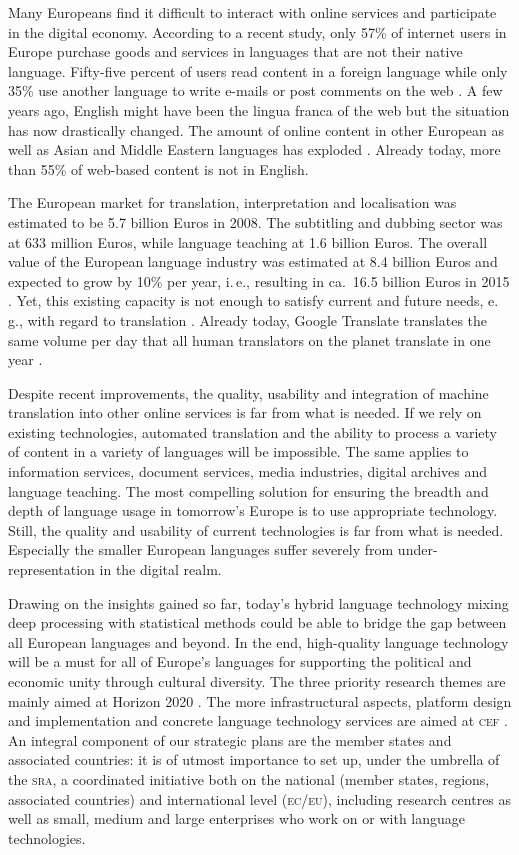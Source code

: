 \documentclass[output=paper]{LSP/langsci}
\begin{document}
Many Europeans find it difficult to interact with online services and
participate in the digital economy. According to a recent study, only
57\% of internet users in Europe purchase goods and services in
languages that are not their native language. Fifty-five percent of users read
content in a foreign language while only 35\% use another language to
write e-mails or post comments on the web \citep{EC1}. A few years
ago, English might have been the lingua franca of the web but the
situation has now drastically changed. The amount of online content in
other European as well as Asian and Middle Eastern languages has
exploded \citep{Ford11}. Already today, more than 55\% of web-based
content is not in English.

The European market for translation, interpretation and localisation
was estimated to be 5.7 billion Euros in 2008. The subtitling and
dubbing sector was at 633 million Euros, while language teaching at 1.6
billion Euros. The overall value of the European language industry was
estimated at 8.4 billion Euros and expected to grow by 10\% per year,
i.\,e., resulting in ca.~16.5 billion Euros in 2015 \citep{EC3,
  EC6}. Yet, this existing capacity is not enough to satisfy current
and future needs, e.\,g., with regard to translation
\citep{csa2009}. Already today, Google Translate translates the same
volume per day that all human translators on the planet translate in
one year \citep{och12}.

\newpage 
Despite recent improvements, the quality, usability and integration of
machine translation into other online services is far from what is
needed. If we rely on existing technologies, automated translation and
the ability to process a variety of content in a variety of languages
will be impossible. The same applies to information services, document
services, media industries, digital archives and language teaching.
The most compelling solution for ensuring the breadth and depth of
language usage in tomorrow's Europe is to use appropriate
technology. Still, the quality and usability of current technologies
is far from what is needed. Especially the smaller European languages
suffer severely from under-representation in the digital realm.

Drawing on the insights gained so far, today's hybrid language
technology mixing deep processing with statistical methods could be
able to bridge the gap between all European languages and beyond. In
the end, high-quality language technology will be a must for all of
Europe's languages for supporting the political and economic unity
through cultural diversity. The three priority research themes are
mainly aimed at Horizon 2020 \citep{H2020}. The more infrastructural
aspects, platform design and implementation and concrete language
technology services are aimed at \textsc{cef} \citep{CEF2011}. An integral
component of our strategic plans are the member states and associated
countries: it is of utmost importance to set up, under the umbrella of
the \textsc{sra}, a coordinated initiative both on the national (member states,
regions, associated countries) and international level (\textsc{ec/eu}),
including research centres as well as small, medium and large
enterprises who work on or with language technologies.
\end{document}
